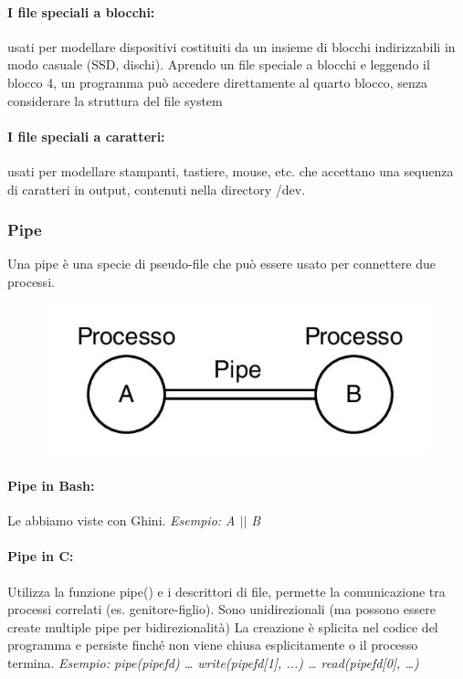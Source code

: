 \paragraph{I file speciali a blocchi:}
usati per modellare dispositivi costituiti da un insieme di blocchi indirizzabili in modo casuale (SSD, dischi). Aprendo un file speciale a blocchi e leggendo il blocco 4, un programma può accedere direttamente al quarto blocco, senza considerare la struttura del file system
\paragraph{I file speciali a caratteri:}
usati per modellare stampanti, tastiere, mouse, etc. che accettano una sequenza di caratteri in output, contenuti nella directory /dev.

\subsubsection{Pipe}
Una pipe è una specie di pseudo-file che può essere usato per
connettere due processi.
\begin{figure}[h]
    \centering
    \includegraphics[width=0.4\linewidth]{Images/Screenshot 2024-12-18 at 13-24-07 so-01-intro-os.pptx - so-01-intro-os.pdf.png}
    \label{fig:enter-label}
\end{figure}

\paragraph{Pipe in Bash:} Le abbiamo viste con Ghini.
\textit{Esempio: A $||$ B}

\paragraph{Pipe in C:} Utilizza la funzione pipe() e i descrittori di file, permette la comunicazione tra processi correlati (es. genitore-figlio). Sono unidirezionali (ma possono essere create multiple pipe per bidirezionalità)
La creazione è splicita nel codice del programma e persiste finché non viene chiusa esplicitamente o il processo termina.
\textit{Esempio:
pipe(pipefd)
… write(pipefd[1], ...)
… read(pipefd[0], …)}